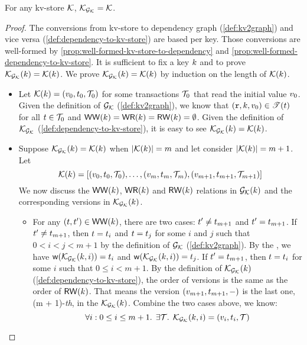 \begin{proposition}
    \label{prop:bijection:mkvs-dgraph}
For any kv-store $\mathcal{K}$, $\mathcal{K}_{\mathcal{G}_{\mathcal{K}}} = \mathcal{K}$.
\end{proposition}
\begin{proof}
The conversions from kv-store to dependency graph (\cref{def:kv2graph}) and vice versa (\cref{def:dependency-to-kv-store}) are based per key.
Those conversions are well-formed by \cref{prop:well-formed-kv-store-to-dependency} and \cref{prop:well-formed-dependency-to-kv-store}.
It is sufficient to fix a key \( k \) and to prove \( \mathcal{K}_{\mathcal{G}_{\mathcal{K}}}(k) = \mathcal{K}(k) \).
We prove \( \mathcal{K}_{\mathcal{G}_{\mathcal{K}}}(k) = \mathcal{K}(k) \) by induction on the length of \( \mathcal{K}(k) \).

\begin{itemize}
    \item {}
Let \( \mathcal{K}(k) = (v_0, t_0, \mathcal{T}_0 ) \) for some transactions \( \mathcal{T}_0 \) that read the initial value \( v_0 \).
Given the definition of \( \mathcal{G}_{\mathcal{K}} \) (\cref{def:kv2graph}), we know that \( (\textnormal{\texttt r}, k, v_0 ) \in \mathscr{T}(t) \) for all \( t \in \mathcal{T}_0 \) and \( \mathsf{WW}(k) = \mathsf{WR}(k) = \mathsf{RW}(k) = \emptyset  \).
Given the definition of \( \mathcal{K}_{\mathcal{G}_{\mathcal{K}}}\) (\cref{def:dependency-to-kv-store}), it is easy to see \( \mathcal{K}_{\mathcal{G}_{\mathcal{K}}}(k) = \mathcal{K}(k) \).

    \item {}
Suppose \( \mathcal{K}_{\mathcal{G}_{\mathcal{K}}}(k) = \mathcal{K}(k) \) when \( |\mathcal{K}(k)| = m \) and let consider  \( |\mathcal{K}(k)| = m + 1 \).
Let 
\[
    \mathcal{K}(k) = \left[ (v_0, t_0, \mathcal{T}_0 ), \dots, (v_m, t_m, \mathcal{T}_m ), (v_{m+1}, t_{m+1}, \mathcal{T}_{m+1} )  \right] 
\]
We now discuss the \( \mathsf{WW}(k) \), \( \mathsf{WR}(k) \) and \( \mathsf{RW}(k) \) relations in \( \mathcal{G}_{\mathcal{K}}(k) \) and the corresponding versions in \( \mathcal{K}_{\mathcal{G}_{\mathcal{K}}}(k) \).
\begin{itemize}
    \item For any \( (t, t') \in \mathsf{WW}(k) \), there are two cases: \( t' \neq t_{m+1} \) and \( t' = t_{m+1} \).
    If \( t' \neq t_{m+1} \), then \( t = t_i \) and \( t = t_j \) for some \( i \) and \( j \) such that \( 0 < i < j < m + 1 \) by the definition of \( \mathcal{G}_{\mathcal{K}} \) (\cref{def:kv2graph}).
    By the \ih, we have \( \mathsf{w}(\mathcal{K}_{\mathcal{G}_{\mathcal{K}}}(k,i))  = t_i \) and \( \mathsf{w}(\mathcal{K}_{\mathcal{G}_{\mathcal{K}}}(k,i))  = t_j \).
    If \( t' = t_{m + 1} \), then \( t = t_i \) for some \( i \) such that \( 0 \leq i < m + 1 \).
    By the definition of  \( \mathcal{K}_{\mathcal{G}_{\mathcal{K}}}(k) \) (\cref{def:dependency-to-kv-store}), the order of versions is the same as the order of \( \mathsf{RW}(k) \).
    That means the version \( (v_{m+1}, t_{m+1}, - ) \) is the last one, \ie (m + 1)-\emph{th}, in the \( \mathcal{K}_{\mathcal{G}_{\mathcal{K}}}(k) \).
    Combine the two cases above, we know:
    \begin{equation}
        \label{equ:ww-back-to-ww}
        \forall i : 0 \leq i \leq m + 1 \ldotp \; \exists \mathcal{T} \ldotp \; \mathcal{K}_{\mathcal{G}_{\mathcal{K}}}(k, i) = (v_i, t_i, \mathcal{T})
    \end{equation}
    

\end{itemize}
\end{itemize}
\end{proof}
